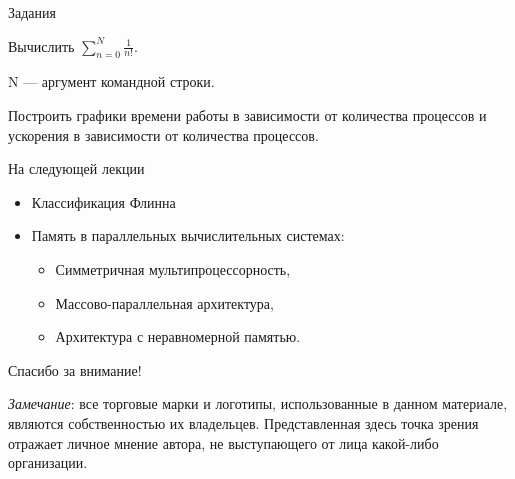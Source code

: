 \begin{frame}{Задания}

Вычислить $\sum \limits_{n=0}^{N} \frac{1}{n!}$.

N --- аргумент командной строки.

Построить графики времени работы в зависимости от количества процессов и ускорения в зависимости от количества процессов.

\end{frame}

\begin{frame}{На следующей лекции}

\begin{itemize}
    \item Классификация Флинна
    \item Память в параллельных вычислительных системах:
    \begin{itemize}
        \item Симметричная мультипроцессорность,
        \item Массово-параллельная архитектура,
        \item Архитектура с неравномерной памятью.
    \end{itemize}
\end{itemize}

\end{frame}

\begin{frame}

{\huge{Спасибо за внимание!}\par}

\vfill

\tiny{\textit{Замечание}: все торговые марки и логотипы, использованные в данном материале, являются собственностью их владельцев. Представленная здесь точка зрения отражает личное мнение автора, не выступающего от лица какой-либо организации.}

\end{frame}


